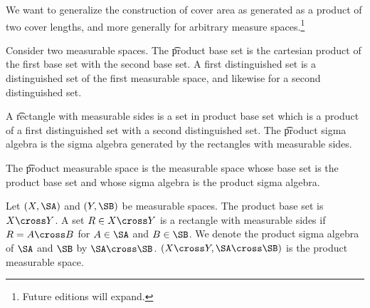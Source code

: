 

We want to generalize the construction of cover area as generated as a product of two cover lengths, and more generally for arbitrary measure spaces.\footnote{Future editions will expand.}


Consider two measurable spaces.
The \t{product base set} is
the cartesian product of
the first base set with
the second base set.
A first distinguished set
is a distinguished set
of the first measurable space,
and likewise for a second distinguished set.

A \t{rectangle with measurable sides} is a set in product base set which is a product of a first distinguished set with a second distinguished set.
The \t{product sigma algebra} is the sigma algebra generated by the rectangles with measurable sides.

The \t{product measurable space} is the measurable space whose base set is the product base set and whose sigma algebra is the product sigma algebra.


Let $(X, \SA)$ and $(Y, \SB)$ be measurable spaces.
The product base set is $X \cross Y$.
A set $R \in X \cross Y$ is a rectangle with measurable sides if $R = A \cross B$ for $A \in \SA$ and $B \in \SB$.
We denote the product sigma algebra of $\SA$ and $\SB$ by $\SA \cross \SB$.
$(X \cross Y, \SA \cross \SB)$ is the product measurable space.

\blankpage
